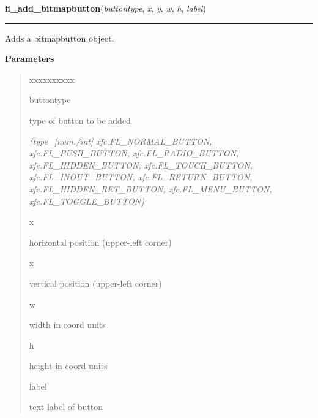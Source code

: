     \label{xformslib:library:fl_add_bitmapbutton}

    \vspace{0.5ex}

\hspace{.8\funcindent}\begin{boxedminipage}{\funcwidth}

    \raggedright \textbf{fl\_add\_bitmapbutton}(\textit{buttontype}, \textit{x}, \textit{y}, \textit{w}, \textit{h}, \textit{label})

    \vspace{-1.5ex}

    \rule{\textwidth}{0.5\fboxrule}
\setlength{\parskip}{2ex}
    Adds a bitmapbutton object.

\setlength{\parskip}{1ex}
      \textbf{Parameters}
      \vspace{-1ex}

      \begin{quote}
        \begin{Ventry}{xxxxxxxxxx}

          \item[buttontype]

          type of button to be added

            {\it (type=[num./int] xfc.FL\_NORMAL\_BUTTON, xfc.FL\_PUSH\_BUTTON, 
xfc.FL\_RADIO\_BUTTON, xfc.FL\_HIDDEN\_BUTTON, xfc.FL\_TOUCH\_BUTTON, 
xfc.FL\_INOUT\_BUTTON, xfc.FL\_RETURN\_BUTTON, xfc.FL\_HIDDEN\_RET\_BUTTON,
xfc.FL\_MENU\_BUTTON, xfc.FL\_TOGGLE\_BUTTON)}

          \item[x]

          horizontal position (upper-left corner)

          \item[x]

          vertical position (upper-left corner)

          \item[w]

          width in coord units

          \item[h]

          height in coord units

          \item[label]

          text label of button


\end{Ventry}
\end{quote}
\end{boxedminipage}
